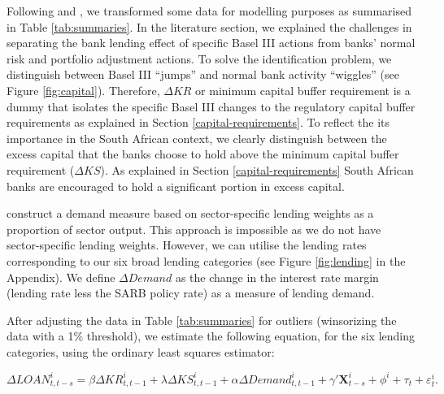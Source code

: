 \documentclass[
  12,
]{article}
\begin{document}
Following \citet{fang2020bank} and \citet{aiyar2016does}, we transformed some data for modelling purposes as summarised in Table \ref{tab:summaries}. In the literature section, we explained the challenges in separating the bank lending effect of specific Basel III actions from banks' normal risk and portfolio adjustment actions. To solve the identification problem, we distinguish between Basel III ``jumps'' and normal bank activity ``wiggles'' (see Figure \ref{fig:capital}). Therefore, \(\Delta KR\) or minimum capital buffer requirement is a dummy that isolates the specific Basel III changes to the regulatory capital buffer requirements as explained in Section \ref{capital-requirements}. To reflect the its importance in the South African context, we clearly distinguish between the excess capital that the banks choose to hold above the minimum capital buffer requirement (\(\Delta KS\)). As explained in Section \ref{capital-requirements} South African banks are encouraged to hold a significant portion in excess capital.

\citet{fang2020bank} construct a demand measure based on sector-specific lending weights as a proportion of sector output. This approach is impossible as we do not have sector-specific lending weights. However, we can utilise the lending rates corresponding to our six broad lending categories (see Figure \ref{fig:lending} in the Appendix). We define \(\Delta Demand\) as the change in the interest rate margin (lending rate less the SARB policy rate) as a measure of lending demand.

After adjusting the data in Table \ref{tab:summaries} for outliers (winsorizing the data with a 1\% threshold), we estimate the following equation, for the six lending categories, using the ordinary least squares estimator:

\[
\Delta LOAN^i_{t, t-s} = \beta \Delta KR^i_{t, t-1} + \lambda \Delta KS^i_{t, t-1} + \alpha \Delta Demand^i_{t, t-1} + \gamma'  \pmb{X}^i_{t-s} + \phi^i + \tau_t + \varepsilon^i_t.
\]
\end{document}
